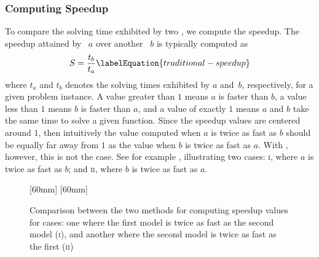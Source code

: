 \subsubsection{Computing Speedup}

\newcommand{\speedupCase}[1]{\textrm{\textsc{#1}}}

To compare the solving time exhibited by two , we
compute the \gls{speedup}.
%
The \gls{speedup} attained by ~$a$ over another
~$b$ is typically computed as
%
\begin{equation}
  S = \frac{t_b}{t_a}
  \labelEquation{traditional-speedup}
\end{equation}
%
where $t_a$ and $t_b$ denotes the solving times exhibited by $a$ and~$b$,
respectively, for a given problem instance.
%
A value greater than $1$ means $a$ is faster than $b$, a value less than $1$
means $b$ is faster than $a$, and a value of exactly $1$ means $a$ and $b$ take
the same time to solve a given \gls{function}.
%
Since the \gls{speedup} values are centered around $1$, then intuitively the
value computed when $a$ is twice as fast as $b$ should be equally far away from
$1$ as the value when $b$ is twice as fast as $a$.
%
With , however, this is not the case.
%
See for example , illustrating two
cases: \speedupCase{i}, where $a$ is twice as fast as $b$; and \speedupCase{ii},
where $b$ is twice as fast as $a$.
%
\begin{figure}
  \renewcommand{\functionName}[1]{{\Large\speedupCase{#1}}}%
  \renewcommand{\plotSpeedupTicsFont}{\large}%
  \renewcommand{\barValueFont}{\scriptsize}%

  \def\insertSpeedupExamplePlot#1{%
    \maxsizebox{30mm}{!}{%
      \trimbox{18pt 8pt 74mm 45mm}{%
      }%
    }%
  }%

                [60mm]%
                {%
                  \insertSpeedupExamplePlot{traditional}%
                }%
  \hfill%
                [60mm]%
                {%
                  \insertSpeedupExamplePlot{normalized}%
                }

  \caption[Comparison between methods for computing speedup values]%
          {%
            Comparison between the two methods for computing speedup values for
            cases: one where the first model is twice as fast as the second
            model (\speedupCase{i}), and another where the second model is twice
            as fast as the first (\speedupCase{ii})%
          }%
\end{figure}
